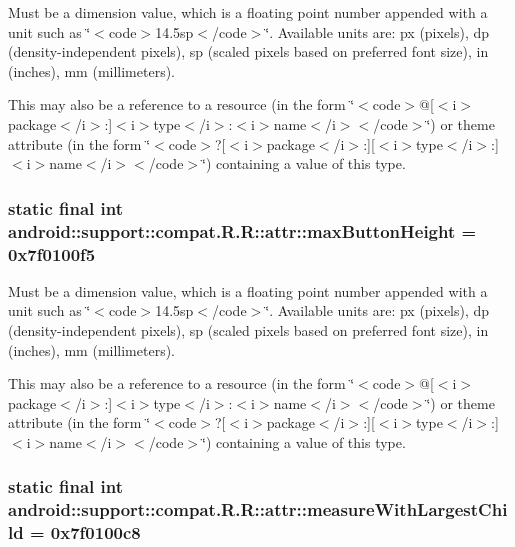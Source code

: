 Must be a dimension value, which is a floating point number appended with a unit such as \char`\"{}$<$code$>$14.5sp$<$/code$>$\char`\"{}. Available units are: px (pixels), dp (density-independent pixels), sp (scaled pixels based on preferred font size), in (inches), mm (millimeters). 

This may also be a reference to a resource (in the form \char`\"{}$<$code$>$@\mbox{[}$<$i$>$package$<$/i$>$:\mbox{]}$<$i$>$type$<$/i$>$:$<$i$>$name$<$/i$>$$<$/code$>$\char`\"{}) or theme attribute (in the form \char`\"{}$<$code$>$?\mbox{[}$<$i$>$package$<$/i$>$:\mbox{]}\mbox{[}$<$i$>$type$<$/i$>$:\mbox{]}$<$i$>$name$<$/i$>$$<$/code$>$\char`\"{}) containing a value of this type. \hypertarget{classandroid_1_1support_1_1compat_1_1_r_1_1attr_bd1e05395a66a8c3a5269e8d2207172e}{
\subsubsection[{maxButtonHeight}]{\setlength{\rightskip}{0pt plus 5cm}static final int android::support::compat.R.R::attr::maxButtonHeight = 0x7f0100f5}}
\label{classandroid_1_1support_1_1compat_1_1_r_1_1attr_bd1e05395a66a8c3a5269e8d2207172e}


Must be a dimension value, which is a floating point number appended with a unit such as \char`\"{}$<$code$>$14.5sp$<$/code$>$\char`\"{}. Available units are: px (pixels), dp (density-independent pixels), sp (scaled pixels based on preferred font size), in (inches), mm (millimeters). 

This may also be a reference to a resource (in the form \char`\"{}$<$code$>$@\mbox{[}$<$i$>$package$<$/i$>$:\mbox{]}$<$i$>$type$<$/i$>$:$<$i$>$name$<$/i$>$$<$/code$>$\char`\"{}) or theme attribute (in the form \char`\"{}$<$code$>$?\mbox{[}$<$i$>$package$<$/i$>$:\mbox{]}\mbox{[}$<$i$>$type$<$/i$>$:\mbox{]}$<$i$>$name$<$/i$>$$<$/code$>$\char`\"{}) containing a value of this type. \hypertarget{classandroid_1_1support_1_1compat_1_1_r_1_1attr_0155f2ffe58a925b8b780ee74f955938}{
\subsubsection[{measureWithLargestChild}]{\setlength{\rightskip}{0pt plus 5cm}static final int android::support::compat.R.R::attr::measureWithLargestChild = 0x7f0100c8}}
\label{classandroid_1_1support_1_1compat_1_1_r_1_1attr_0155f2ffe58a925b8b780ee74f955938}


